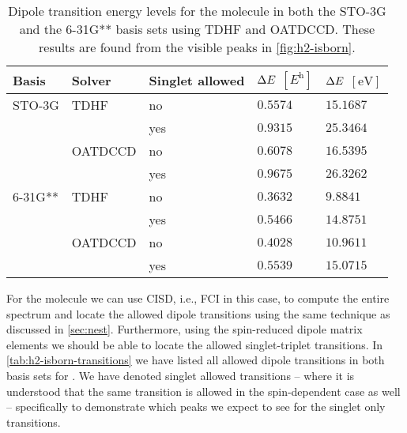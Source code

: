         \begin{table}
            \centering
            \caption{Dipole transition energy levels for the  molecule in
            both the STO-3G and the 6-31G** basis sets using TDHF and OATDCCD.
            These results are found from the visible peaks in
            \autoref{fig:h2-isborn}.}
            \renewcommand{\arraystretch}{1.3}
            \begin{tabular}{@{}lllll@{}}
                \toprule
                Basis & Solver & Singlet allowed
                & $\Delta E$ $[\si{\hartree}]$
                & $\Delta E$ $[\si{\electronvolt}]$
                \\
                \midrule
                STO-3G & TDHF & no & $0.5574$ & $15.1687$ \\
                & & yes & $0.9315$ & $25.3464$ \\
                & OATDCCD& no & $0.6078$ & $16.5395$ \\
                & & yes & $0.9675$ & $26.3262$ \\
                6-31G** & TDHF & no & $0.3632$ & $9.8841$ \\
                & & yes & $0.5466$ & $14.8751$ \\
                & OATDCCD & no & $0.4028$ & $10.9611$ \\
                & & yes & $0.5539$ & $15.0715$ \\
                \bottomrule
            \end{tabular}
            \label{tab:h2-isborn}
        \end{table}
        For the  molecule we can use CISD, i.e., FCI in this case, to
        compute the entire spectrum and locate the allowed dipole transitions
        using the same technique as discussed in \autoref{sec:nest}.
        Furthermore, using the spin-reduced dipole matrix elements we should
        be able to locate the allowed singlet-triplet transitions.
        In \autoref{tab:h2-isborn-transitions} we have listed all allowed
        dipole transitions in both basis sets for .
        We have denoted singlet allowed transitions -- where it is understood that
        the same transition is allowed in the spin-dependent case as well --
        specifically to demonstrate which peaks we expect to see for the singlet
        only transitions.
